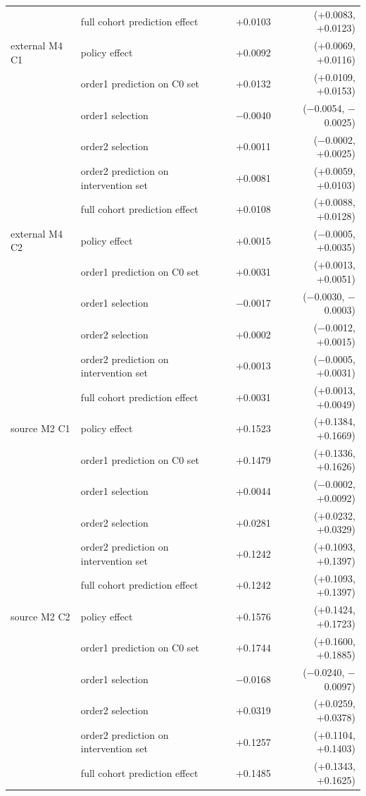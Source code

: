 \begin{longtable}{lllrr}
 & full cohort prediction effect & & +0.0103 & (+0.0083, +0.0123)\\
external M4 C1 & policy effect & & +0.0092 & (+0.0069, +0.0116)\\
 & order1 prediction on C0 set & & +0.0132 & (+0.0109, +0.0153)\\
 & order1 selection & & $-$0.0040 & ($-$0.0054, $-$0.0025)\\
 & order2 selection & & +0.0011 & ($-$0.0002, +0.0025)\\
 & order2 prediction on intervention set & & +0.0081 & (+0.0059, +0.0103)\\
 & full cohort prediction effect & & +0.0108 & (+0.0088, +0.0128)\\
external M4 C2 & policy effect & & +0.0015 & ($-$0.0005, +0.0035)\\
 & order1 prediction on C0 set & & +0.0031 & (+0.0013, +0.0051)\\
 & order1 selection & & $-$0.0017 & ($-$0.0030, $-$0.0003)\\
 & order2 selection & & +0.0002 & ($-$0.0012, +0.0015)\\
 & order2 prediction on intervention set & & +0.0013 & ($-$0.0005, +0.0031)\\
 & full cohort prediction effect & & +0.0031 & (+0.0013, +0.0049)\\
source M2 C1 & policy effect & & +0.1523 & (+0.1384, +0.1669)\\
 & order1 prediction on C0 set & & +0.1479 & (+0.1336, +0.1626)\\
 & order1 selection & & +0.0044 & ($-$0.0002, +0.0092)\\
 & order2 selection & & +0.0281 & (+0.0232, +0.0329)\\
 & order2 prediction on intervention set & & +0.1242 & (+0.1093, +0.1397)\\
 & full cohort prediction effect & & +0.1242 & (+0.1093, +0.1397)\\
source M2 C2 & policy effect & & +0.1576 & (+0.1424, +0.1723)\\
 & order1 prediction on C0 set & & +0.1744 & (+0.1600, +0.1885)\\
 & order1 selection & & $-$0.0168 & ($-$0.0240, $-$0.0097)\\
 & order2 selection & & +0.0319 & (+0.0259, +0.0378)\\
 & order2 prediction on intervention set & & +0.1257 & (+0.1104, +0.1403)\\
 & full cohort prediction effect & & +0.1485 & (+0.1343, +0.1625)\\

\end{longtable}
